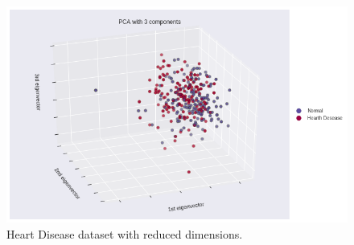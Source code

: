\documentclass[12pt]{article}
\begin{document}
\begin{figure}[H]
    \centering
    \includegraphics[width=\textwidth]{img/pca.png}
    \caption{Heart Disease dataset with reduced dimensions.}
\end{figure}

\printbibliography
\end{document}
